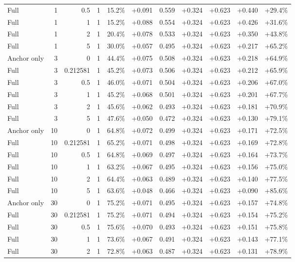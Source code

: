 \begin{table}[htbp]
\begin{tabular}{lrrrccccccc}
Full & 1 & 0.5 & 1 & 15.2\% & +0.091 & 0.559 & +0.324 & +0.623 & +0.440 & +29.4\% \\
Full & 1 & 1 & 1 & 15.2\% & +0.088 & 0.554 & +0.324 & +0.623 & +0.426 & +31.6\% \\
Full & 1 & 2 & 1 & 20.4\% & +0.078 & 0.533 & +0.324 & +0.623 & +0.350 & +43.8\% \\
Full & 1 & 5 & 1 & 30.0\% & +0.057 & 0.495 & +0.324 & +0.623 & +0.217 & +65.2\% \\
Anchor only & 3 & 0 & 1 & 44.4\% & +0.075 & 0.508 & +0.324 & +0.623 & +0.218 & +64.9\% \\
Full & 3 & 0.212581 & 1 & 45.2\% & +0.073 & 0.506 & +0.324 & +0.623 & +0.212 & +65.9\% \\
Full & 3 & 0.5 & 1 & 46.0\% & +0.071 & 0.504 & +0.324 & +0.623 & +0.206 & +67.0\% \\
Full & 3 & 1 & 1 & 45.2\% & +0.068 & 0.501 & +0.324 & +0.623 & +0.201 & +67.7\% \\
Full & 3 & 2 & 1 & 45.6\% & +0.062 & 0.493 & +0.324 & +0.623 & +0.181 & +70.9\% \\
Full & 3 & 5 & 1 & 47.6\% & +0.050 & 0.472 & +0.324 & +0.623 & +0.130 & +79.1\% \\
Anchor only & 10 & 0 & 1 & 64.8\% & +0.072 & 0.499 & +0.324 & +0.623 & +0.171 & +72.5\% \\
Full & 10 & 0.212581 & 1 & 65.2\% & +0.071 & 0.498 & +0.324 & +0.623 & +0.169 & +72.8\% \\
Full & 10 & 0.5 & 1 & 64.8\% & +0.069 & 0.497 & +0.324 & +0.623 & +0.164 & +73.7\% \\
Full & 10 & 1 & 1 & 63.2\% & +0.067 & 0.495 & +0.324 & +0.623 & +0.156 & +75.0\% \\
Full & 10 & 2 & 1 & 64.4\% & +0.063 & 0.489 & +0.324 & +0.623 & +0.140 & +77.5\% \\
Full & 10 & 5 & 1 & 63.6\% & +0.048 & 0.466 & +0.324 & +0.623 & +0.090 & +85.6\% \\
Anchor only & 30 & 0 & 1 & 75.2\% & +0.071 & 0.495 & +0.324 & +0.623 & +0.157 & +74.8\% \\
Full & 30 & 0.212581 & 1 & 75.2\% & +0.071 & 0.494 & +0.324 & +0.623 & +0.154 & +75.2\% \\
Full & 30 & 0.5 & 1 & 75.6\% & +0.070 & 0.493 & +0.324 & +0.623 & +0.151 & +75.8\% \\
Full & 30 & 1 & 1 & 73.6\% & +0.067 & 0.491 & +0.324 & +0.623 & +0.143 & +77.1\% \\
Full & 30 & 2 & 1 & 72.8\% & +0.063 & 0.487 & +0.324 & +0.623 & +0.131 & +78.9\% \\

\end{tabular}
\end{table}
